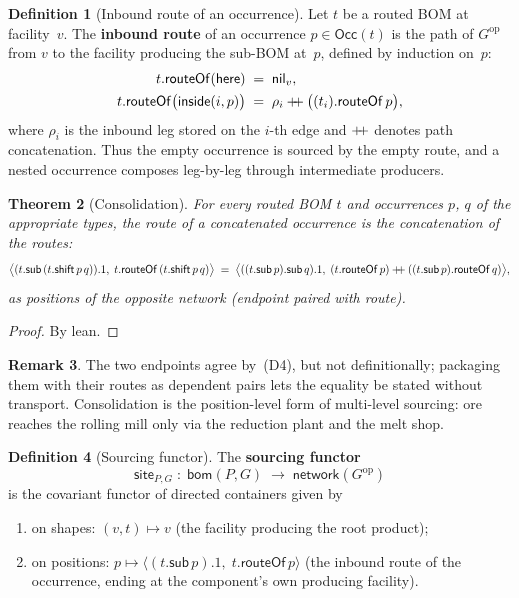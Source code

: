 \documentclass[11pt,a4paper]{article}
\theoremstyle{plain}
\newtheorem{theorem}{Theorem}[section]
\theoremstyle{definition}
\newtheorem{definition}[theorem]{Definition}
\newtheorem{remark}[theorem]{Remark}
\newcommand{\bom}{\mathsf{bom}}
\newcommand{\Occ}{\mathsf{Occ}}
\newcommand{\site}{\mathsf{site}}
\newcommand{\op}{\mathrm{op}}
\begin{document}
\begin{definition}[Inbound route of an occurrence]\label{def:routeOf}
Let $t$ be a routed BOM at facility~$v$. The \textbf{inbound route} of an
occurrence $p \in \Occ(t)$ is the path of $G^\op$ from $v$ to the facility
producing the sub-BOM at~$p$, defined by induction on~$p$:
\begin{align}
  t.\mathsf{routeOf}(\mathsf{here})
  &\;=\;
  \mathsf{nil}_v, \\
  t.\mathsf{routeOf}\bigl(\mathsf{inside}(i,p)\bigr)
  &\;=\;
  \rho_i \mathbin{+\mkern-6mu+}
  \bigl((t_i).\mathsf{routeOf}\,p\bigr),
\end{align}
where $\rho_i$ is the inbound leg stored on the $i$-th edge and
$+\mkern-6mu+$ denotes path concatenation. Thus the empty occurrence is
sourced by the empty route, and a nested occurrence composes leg-by-leg
through intermediate producers.
\end{definition}

\begin{theorem}[Consolidation]\label{thm:consolidation}
For every routed BOM $t$ and occurrences $p$, $q$ of the appropriate
types, the route of a concatenated occurrence is the concatenation of the
routes:
\begin{equation}
  \bigl\langle
    (t.\mathsf{sub}\,(t.\mathsf{shift}\,p\,q)).1,\;
    t.\mathsf{routeOf}\,(t.\mathsf{shift}\,p\,q)
  \bigr\rangle
  \;=\;
  \bigl\langle
    ((t.\mathsf{sub}\,p).\mathsf{sub}\,q).1,\;
    (t.\mathsf{routeOf}\,p)
    \mathbin{+\mkern-6mu+}
    ((t.\mathsf{sub}\,p).\mathsf{routeOf}\,q)
  \bigr\rangle,
\end{equation}
as positions of the opposite network (endpoint paired with route).
\end{theorem}

\begin{proof}
By lean.
\end{proof}

\begin{remark}
The two endpoints agree by~(D4), but not definitionally; packaging them
with their routes as dependent pairs lets the equality be stated without
transport. Consolidation is the position-level form of multi-level
sourcing: ore reaches the rolling mill only via the reduction plant and
the melt shop.
\end{remark}

\begin{definition}[Sourcing functor]\label{def:sourcing}
The \textbf{sourcing functor}
\[
  \site_{P,G}
  \;:\;
  \bom(P,G)
  \;\longrightarrow\;
  \mathsf{network}(G^\op)
\]
is the covariant functor of directed containers given by
\begin{enumerate}
  \item on shapes: $(v,t) \mapsto v$ (the facility producing the root
        product);
  \item on positions: $p \mapsto
        \bigl\langle
          (t.\mathsf{sub}\,p).1,\;
          t.\mathsf{routeOf}\,p
        \bigr\rangle$
        (the inbound route of the occurrence, ending at the component's
        own producing facility).
\end{enumerate}
\end{definition}
\end{document}
